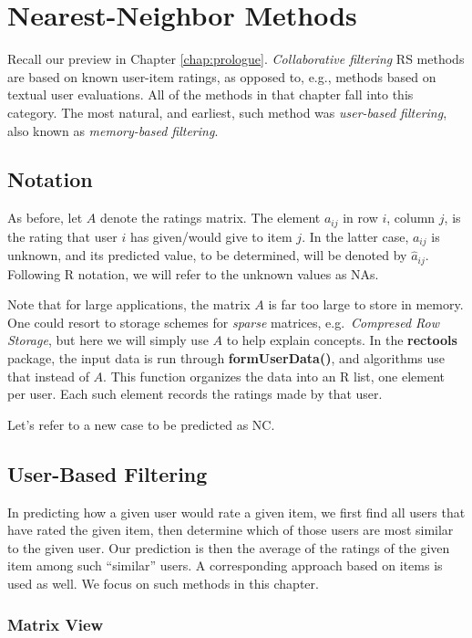 \chapter{Nearest-Neighbor Methods}  
\label{chap:knn} 

Recall our preview in Chapter \ref{chap:prologue}.
\textit{Collaborative filtering} RS methods are based on known user-item
ratings, as opposed to, e.g., methods based on textual user evaluations.
All of the methods in that chapter fall into this category.  The most
natural, and earliest, such method was \textit{user-based filtering},
also known as \textit{memory-based filtering}.

\section{Notation}

As before, let $A$ denote the ratings matrix.  The element $a_{ij}$ in
row $i$, column $j$, is the rating that user $i$ has given/would give to
item $j$. In the latter case, $a_{ij}$ is unknown, and its predicted
value, to be determined, will be denoted by $\widehat{a}_{ij}$.
Following R notation, we will refer to the unknown values as NAs.

Note that for large applications, the matrix $A$ is far too large to
store in memory.  One could resort to storage schemes for
\textit{sparse} matrices, e.g.\ \textit{Compresed Row Storage}, but here
we will simply use $A$ to help explain concepts.  In the
\textbf{rectools} package, the input data is run through
\textbf{formUserData()}, and algorithms use that instead of $A$.  This
function organizes the data into an R list, one element per user.  Each
such element records the ratings made by that user. 

Let's refer to a new case to be predicted as NC.

\section{User-Based Filtering}

In predicting how a given user would rate a given item, we first find
all users that have rated the given item, then determine which of those
users are most similar to the given user.  Our prediction is then the
average of the ratings of the given item among such ``similar'' users.
A corresponding approach based on items is used as well.  We focus on
such methods in this chapter.

\subsection{Matrix View}
\label{matrixview}

